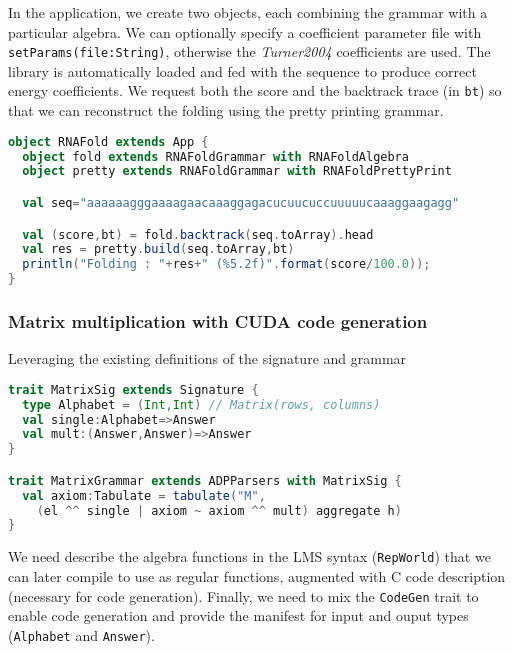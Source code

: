 In the application, we create two objects, each combining the grammar with a particular algebra. We can optionally specify a coefficient parameter file with {\tt setParams(file:String)}, otherwise the \textit{Turner2004} coefficients are used. The library is automatically loaded and fed with the sequence to produce correct energy coefficients. We request both the score and the backtrack trace (in {\tt bt}) so that we can reconstruct the folding using the pretty printing grammar.
\begin{lstlisting}[language=Scala,captionpos=none]
object RNAFold extends App {
  object fold extends RNAFoldGrammar with RNAFoldAlgebra
  object pretty extends RNAFoldGrammar with RNAFoldPrettyPrint

  val seq="aaaaaagggaaaagaacaaaggagacucuucuccuuuuucaaaggaagagg"

  val (score,bt) = fold.backtrack(seq.toArray).head
  val res = pretty.build(seq.toArray,bt)
  println("Folding : "+res+" (%5.2f)".format(score/100.0));
}
\end{lstlisting}

\newpage
\subsubsection{Matrix multiplication with CUDA code generation} \label{ex_matmult_cuda_lms}
Leveraging the existing definitions of the signature and grammar
\begin{lstlisting}[language=Scala,captionpos=none]
trait MatrixSig extends Signature {
  type Alphabet = (Int,Int) // Matrix(rows, columns)
  val single:Alphabet=>Answer
  val mult:(Answer,Answer)=>Answer
}

trait MatrixGrammar extends ADPParsers with MatrixSig {
  val axiom:Tabulate = tabulate("M",
    (el ^^ single | axiom ~ axiom ^^ mult) aggregate h)
}
\end{lstlisting}
We need describe the algebra functions in the LMS syntax ({\tt RepWorld}) that we can later compile to use as regular functions, augmented with C code description (necessary for code generation). Finally, we need to mix the {\tt CodeGen} trait to enable code generation and provide the manifest for input and ouput types ({\tt Alphabet} and {\tt Answer}).


